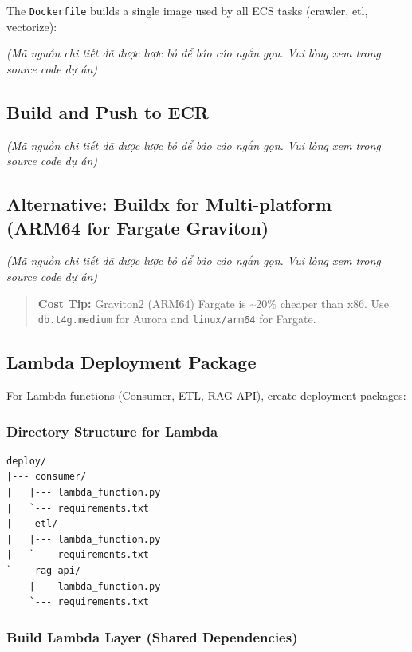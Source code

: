 The \texttt{Dockerfile} builds a single image used by all ECS tasks
(crawler, etl, vectorize):

\emph{(Mã nguồn chi tiết đã được lược bỏ để báo cáo ngắn gọn. Vui lòng
xem trong source code dự án)}

\hypertarget{build-and-push-to-ecr}{%
\subsection{Build and Push to ECR}}

\emph{(Mã nguồn chi tiết đã được lược bỏ để báo cáo ngắn gọn. Vui lòng
xem trong source code dự án)}

\hypertarget{alternative-buildx-for-multi-platform-arm64-for-fargate-graviton}{%
\subsection{Alternative: Buildx for Multi-platform (ARM64 for Fargate
Graviton)}}

\emph{(Mã nguồn chi tiết đã được lược bỏ để báo cáo ngắn gọn. Vui lòng
xem trong source code dự án)}

\begin{quote}
\textbf{Cost Tip:} Graviton2 (ARM64) Fargate is \textasciitilde20\%
cheaper than x86. Use \texttt{db.t4g.medium} for Aurora and
\texttt{linux/arm64} for Fargate.
\end{quote}

\hypertarget{lambda-deployment-package}{%
\subsection{Lambda Deployment Package}}

For Lambda functions (Consumer, ETL, RAG API), create deployment
packages:

\hypertarget{directory-structure-for-lambda}{%
\subsubsection{Directory Structure for
Lambda}}

\begin{verbatim}
deploy/
|--- consumer/
|   |--- lambda_function.py
|   `--- requirements.txt
|--- etl/
|   |--- lambda_function.py
|   `--- requirements.txt
`--- rag-api/
    |--- lambda_function.py
    `--- requirements.txt
\end{verbatim}

\hypertarget{build-lambda-layer-shared-dependencies}{%
\subsubsection{Build Lambda Layer (Shared
Dependencies)}}

